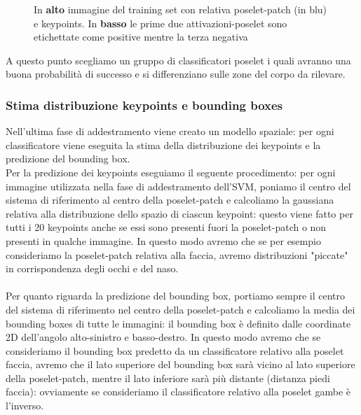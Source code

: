 \begin{figure}[h]
 \centering
 \newline
 \hspace{5mm}
 \hspace{5mm}
 \caption{In \textbf{alto} immagine del training set con relativa poselet-patch (in blu) e keypoints. In \textbf{basso} le prime due attivazioni-poselet sono etichettate come positive mentre la terza negativa}
 \end{figure}

A questo punto scegliamo un gruppo di classificatori poselet i quali avranno una buona probabilità di successo e si differenziano sulle zone del corpo da rilevare.\\

\subsubsection{Stima distribuzione keypoints e bounding boxes}
Nell'ultima fase di addestramento viene creato un modello spaziale: per ogni classificatore viene eseguita la stima della distribuzione dei keypoints e la predizione del bounding box.\\
Per la predizione dei keypoints eseguiamo il seguente procedimento: per ogni immagine utilizzata nella fase di addestramento dell'SVM, poniamo il centro del sistema di riferimento al centro della poselet-patch e calcoliamo la gaussiana relativa alla distribuzione dello spazio di ciascun keypoint: questo viene fatto per tutti i 20 keypoints anche se essi sono presenti fuori la poselet-patch o non presenti in qualche immagine. In questo modo avremo che se per esempio consideriamo la poselet-patch relativa alla faccia, avremo distribuzioni "piccate" in corrispondenza degli occhi e del naso.\\ \\
Per quanto riguarda la predizione del bounding box, portiamo sempre il centro del sistema di riferimento nel centro della poselet-patch e calcoliamo la media dei bounding boxes di tutte le immagini: il bounding box è definito dalle coordinate 2D dell'angolo alto-sinistro e basso-destro. In questo modo avremo che se consideriamo il bounding box predetto da un classificatore relativo alla poselet faccia, avremo che il lato superiore del bounding box sarà vicino al lato superiore della poselet-patch, mentre il lato inferiore sarà più distante (distanza piedi faccia): ovviamente se consideriamo il classificatore relativo alla poselet gambe è l'inverso.

